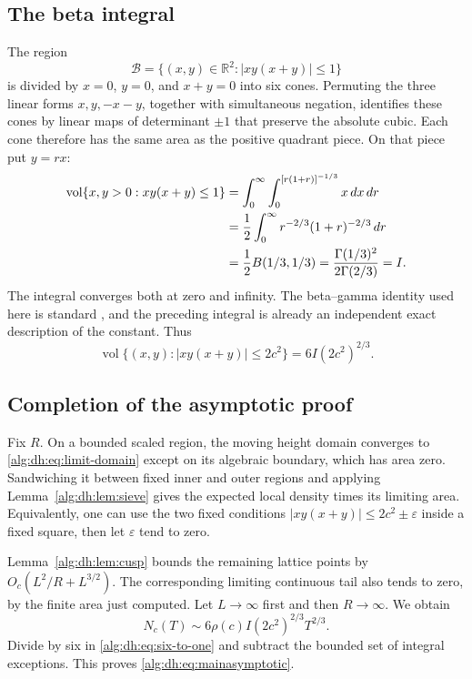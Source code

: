 \documentclass[11pt]{article}
\numberwithin{equation}{section}
\theoremstyle{plain}
\theoremstyle{plain}
\theoremstyle{plain}
\theoremstyle{definition}
\theoremstyle{definition}
\theoremstyle{definition}
\theoremstyle{remark}
\newcommand{\R}{\mathbb R}\newcommand{\C}{\mathbb C}
\newcommand{\vol}{\operatorname{vol}}
\newcommand{\calB}{\mathcal B}
\begin{document}
\subsection{The beta integral}
The region
\[
 \calB=\{(x,y)\in\R^2:|xy(x+y)|\le1\}
\]
is divided by $x=0$, $y=0$, and $x+y=0$ into six cones. Permuting the
three linear forms $x,y,-x-y$, together with simultaneous negation,
identifies these cones by linear maps of determinant $\pm1$ that preserve
the absolute cubic. Each cone therefore has the same area as the positive
quadrant piece. On that piece put $y=rx$:
\begin{align}\label{alg:dh:eq:area}
 \vol\{x,y>0:xy(x+y)\le1\}
 &=\int_0^\infty\int_0^{[r(1+r)]^{-1/3}}x\,dx\,dr\notag\\
 &=\frac12\int_0^\infty r^{-2/3}(1+r)^{-2/3}\,dr\notag\\
 &=\frac12 B(1/3,1/3)
 =\frac{\Gamma(1/3)^2}{2\Gamma(2/3)}=I.
\end{align}
The integral converges both at zero and infinity. The beta--gamma identity
used here is standard \cite{dh:dlmf}, and the preceding integral is already
an independent exact description of the constant. Thus
\begin{equation}\label{alg:dh:eq:full-area}
 \vol\{(x,y):|xy(x+y)|\le2c^2\}=6I(2c^2)^{2/3}.
\end{equation}

\subsection{Completion of the asymptotic proof}
Fix $R$. On a bounded scaled region, the moving height domain converges
to \eqref{alg:dh:eq:limit-domain} except on its algebraic boundary, which has
area zero. Sandwiching it between fixed inner and outer regions and
applying Lemma~\ref{alg:dh:lem:sieve} gives the expected local density times
its limiting area. Equivalently, one can use the two fixed conditions
$|xy(x+y)|\le2c^2\pm\varepsilon$ inside a fixed square, then let
$\varepsilon$ tend to zero.

Lemma~\ref{alg:dh:lem:cusp} bounds the remaining lattice points by
$O_c(L^2/R+L^{3/2})$. The corresponding limiting continuous tail also
tends to zero, by the finite area just computed. Let $L\to\infty$ first
and then $R\to\infty$. We obtain
\[
 N_c(T)\sim6\rho(c)I(2c^2)^{2/3}T^{2/3}.
\]
Divide by six in \eqref{alg:dh:eq:six-to-one} and subtract the bounded set of
integral exceptions. This proves \eqref{alg:dh:eq:mainasymptotic}.
\end{document}
